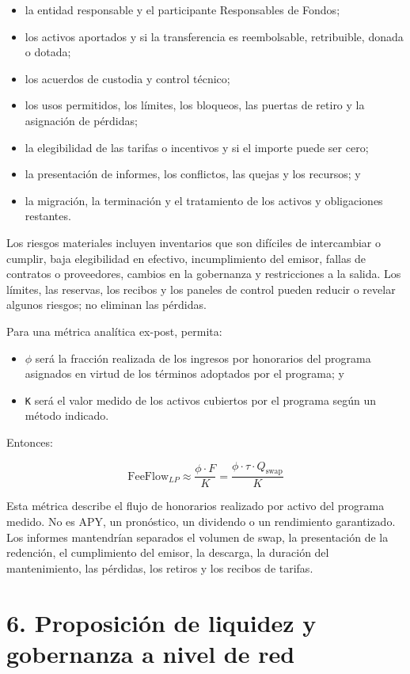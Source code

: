 \documentclass[11pt]{article}
\begin{document}
\begin{itemize}[leftmargin=*]
\item la entidad responsable y el participante Responsables de Fondos;
\item los activos aportados y si la transferencia es reembolsable, retribuible, donada o dotada;
\item los acuerdos de custodia y control técnico;
\item los usos permitidos, los límites, los bloqueos, las puertas de retiro y la asignación de pérdidas;
\item la elegibilidad de las tarifas o incentivos y si el importe puede ser cero;
\item la presentación de informes, los conflictos, las quejas y los recursos; y
\item la migración, la terminación y el tratamiento de los activos y obligaciones restantes.
\end{itemize}
Los riesgos materiales incluyen inventarios que son difíciles de intercambiar o cumplir, baja elegibilidad en efectivo, incumplimiento del emisor, fallas de contratos o proveedores, cambios en la gobernanza y restricciones a la salida. Los límites, las reservas, los recibos y los paneles de control pueden reducir o revelar algunos riesgos; no eliminan las pérdidas.

Para una métrica analítica ex-post, permita:

\begin{itemize}[leftmargin=*]
\item \texttt{$\phi$} será la fracción realizada de los ingresos por honorarios del programa asignados en virtud de los términos adoptados por el programa; y
\item \texttt{K} será el valor medido de los activos cubiertos por el programa según un método indicado.
\end{itemize}
Entonces:

\[
\mathrm{FeeFlow}_{LP} \approx \frac{\phi \cdot F}{K} = \frac{\phi \cdot \tau \cdot Q_{\mathrm{swap}}}{K}
\]

Esta métrica describe el flujo de honorarios realizado por activo del programa medido. No es APY, un pronóstico, un dividendo o un rendimiento garantizado. Los informes mantendrían separados el volumen de swap, la presentación de la redención, el cumplimiento del emisor, la descarga, la duración del mantenimiento, las pérdidas, los retiros y los recibos de tarifas.


\section*{6. Proposición de liquidez y gobernanza a nivel de red}
\end{document}
